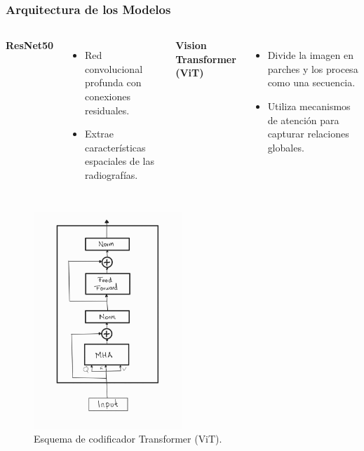 \begin{frame}
\frametitle{Arquitectura de los Modelos}
\begin{columns}
\textbf{ResNet50}
\begin{itemize}
    \item Red convolucional profunda con conexiones residuales.
    \item Extrae características espaciales de las radiografías.
\end{itemize}
\textbf{Vision Transformer (ViT)}
\begin{itemize}
    \item Divide la imagen en parches y los procesa como una secuencia.
    \item Utiliza mecanismos de atención para capturar relaciones globales.
\end{itemize}
\end{columns}
\begin{figure}[ht!]
    \centering
    \includegraphics[width=0.5\textwidth]{../Chapters/2. Transformer/Figures/transformer/encoder.jpg}
    \caption{Esquema de codificador Transformer (ViT).}
\end{figure}
\end{frame}

